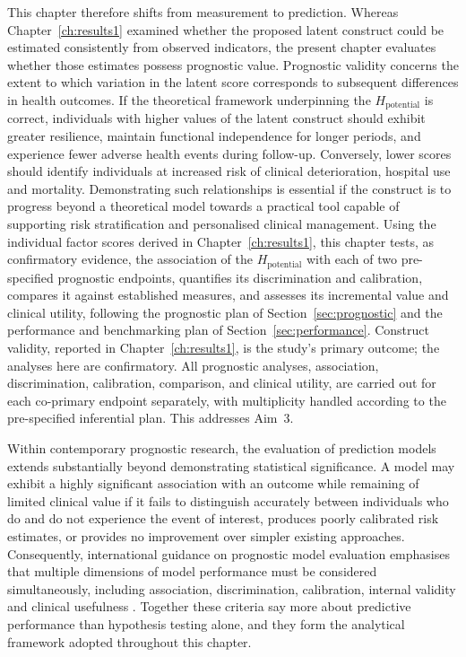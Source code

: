 This chapter therefore shifts from measurement to prediction. Whereas Chapter~\ref{ch:results1} examined whether the proposed latent construct could be estimated consistently from observed indicators, the present chapter evaluates whether those estimates possess prognostic value. Prognostic validity concerns the extent to which variation in the latent score corresponds to subsequent differences in health outcomes. If the theoretical framework underpinning the $H_{\text{potential}}$ is correct, individuals with higher values of the latent construct should exhibit greater resilience, maintain functional independence for longer periods, and experience fewer adverse health events during follow-up. Conversely, lower scores should identify individuals at increased risk of clinical deterioration, hospital use and mortality. Demonstrating such relationships is essential if the construct is to progress beyond a theoretical model towards a practical tool capable of supporting risk stratification and personalised clinical management. Using the individual factor scores derived in Chapter~\ref{ch:results1}, this chapter tests, as confirmatory evidence, the association of the $H_{\text{potential}}$ with each of two pre-specified prognostic endpoints, quantifies its discrimination and calibration, compares it against established measures, and assesses its incremental value and clinical utility, following the prognostic plan of Section~\ref{sec:prognostic} and the performance and benchmarking plan of Section~\ref{sec:performance}. Construct validity, reported in Chapter~\ref{ch:results1}, is the study's primary outcome; the analyses here are confirmatory. All prognostic analyses, association, discrimination, calibration, comparison, and clinical utility, are carried out for each co-primary endpoint separately, with multiplicity handled according to the pre-specified inferential plan. This addresses Aim~3.

Within contemporary prognostic research, the evaluation of prediction models extends substantially beyond demonstrating statistical significance. A model may exhibit a highly significant association with an outcome while remaining of limited clinical value if it fails to distinguish accurately between individuals who do and do not experience the event of interest, produces poorly calibrated risk estimates, or provides no improvement over simpler existing approaches. Consequently, international guidance on prognostic model evaluation emphasises that multiple dimensions of model performance must be considered simultaneously, including association, discrimination, calibration, internal validity and clinical usefulness \citep{steyerberg_2019,vancalster_2019,collins_2015}. Together these criteria say more about predictive performance than hypothesis testing alone, and they form the analytical framework adopted throughout this chapter.

